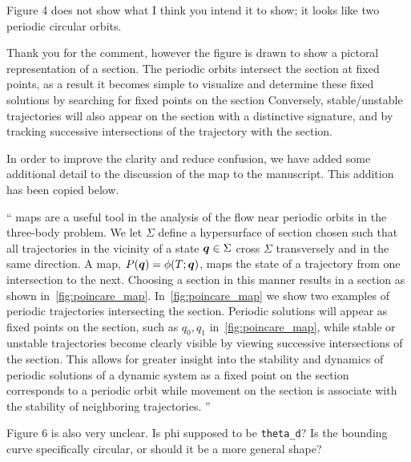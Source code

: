 \documentclass[11pt]{article}
\newenvironment{correction}{\begin{list}{}{\setlength{\leftmargin}{1cm}\setlength{\rightmargin}{1cm}}\vspace{\parsep}\item[]``}{''\end{list}}
\begin{document}
\begin{enumerate}
\item
    \begin{itshape}
Figure 4 does not show what I think you intend it to show; it looks like two periodic circular orbits.
\end{itshape}

Thank you for the comment, however the figure is drawn to show a pictoral representation of a \Poincare section.
The periodic orbits intersect the section at fixed points, as a result it becomes simple to visualize and determine these fixed solutions by searching for fixed points on the section
Conversely, stable/unstable trajectories will also appear on the section with a distinctive signature, and by tracking successive intersections of the trajectory with the \Poincare section.

In order to improve the clarity and reduce confusion, we have added some additional detail to the discussion of the \Poincare map to the manuscript.
This addition has been copied below.

\begin{correction}
\Poincare maps are a useful tool in the analysis of the flow near periodic orbits in the three-body problem.
We let \( \Sigma \) define a hypersurface of section chosen such that all trajectories in the vicinity of a state \( \bm{q} \in \Sigma \) cross \( \Sigma \) transversely and in the same direction.
A \Poincare map, \( P(\bm{q}) = \phi(T;\bm{q}) \), maps the state of a trajectory from one intersection to the next.
Choosing a section in this manner results in a \Poincare section as shown in~\cref{fig:poincare_map}.
In~\cref{fig:poincare_map} we show two examples of periodic trajectories intersecting the \Poincare section. 
Periodic solutions will appear as fixed points on the section, such as \( q_0, q_1 \) in~\cref{fig:poincare_map}, while stable or unstable trajectories become clearly visible by viewing successive intersections of the section.
This allows for greater insight into the stability and dynamics of periodic solutions of a dynamic system as a fixed point on the \Poincare section corresponds to a periodic orbit while movement on the section is associate with the stability of neighboring trajectories. 
\end{correction}

\item
    \begin{itshape}
Figure 6 is also very unclear.  Is phi supposed to be \texttt{theta\_d}?  Is the bounding curve specifically circular, or should it be a more general shape?
\end{itshape}


\end{enumerate}
\end{document}
